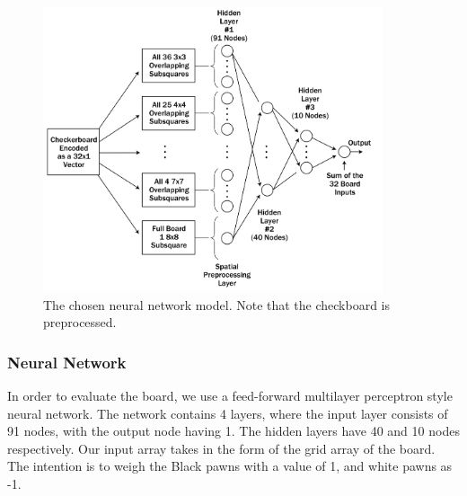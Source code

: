 \documentclass[12pt,a4paper]{article}
\begin{document}
    
    \begin{figure}[ht!]
        \centering
        \caption{The chosen neural network model. Note that the checkboard is preprocessed. \label{overflow}}
        \includegraphics[width=100mm]{nnmodel.png}
    \end{figure}

    
\subsubsection{Neural Network}

    In order to evaluate the board, we use a feed-forward multilayer perceptron style neural network. The network contains 4 layers, where the input layer consists of 91 nodes, with the output node having 1. The hidden layers have 40 and 10 nodes respectively. Our input array takes in the form of the grid array of the board. The intention is to weigh the Black pawns with a value of 1, and white pawns as -1. 
\end{document}

